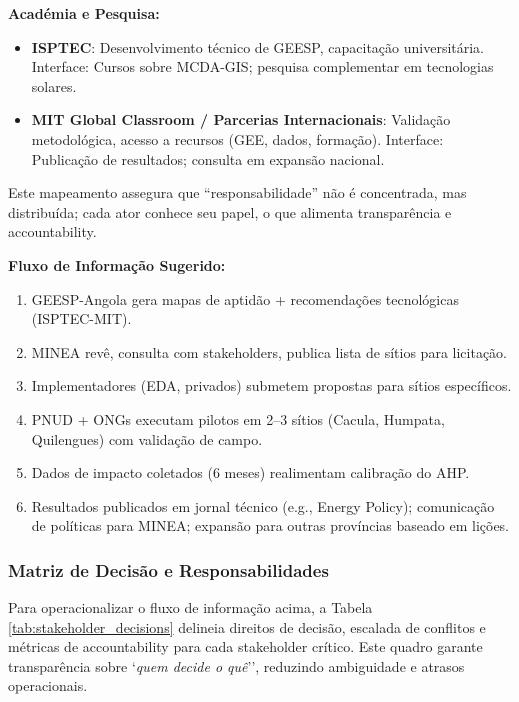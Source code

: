 \documentclass[12pt, a4paper]{article}
\begin{document}
\begin{itemize}
\textbf{Académia e Pesquisa:}
\begin{itemize}
\item \textbf{ISPTEC}: Desenvolvimento técnico de GEESP, capacitação universitária. Interface: Cursos sobre MCDA-GIS; pesquisa complementar em tecnologias solares.
\item \textbf{MIT Global Classroom / Parcerias Internacionais}: Validação metodológica, acesso a recursos (GEE, dados, formação). Interface: Publicação de resultados; consulta em expansão nacional.
\end{itemize}

Este mapeamento assegura que ``responsabilidade'' não é concentrada, mas distribuída; cada ator conhece seu papel, o que alimenta transparência e accountability.

\textbf{Fluxo de Informação Sugerido:}

\begin{enumerate}
\item GEESP-Angola gera mapas de aptidão + recomendações tecnológicas (ISPTEC-MIT).
\item MINEA revê, consulta com stakeholders, publica lista de sítios para licitação.
\item Implementadores (EDA, privados) submetem propostas para sítios específicos.
\item PNUD + ONGs executam pilotos em 2--3 sítios (Cacula, Humpata, Quilengues) com validação de campo.
\item Dados de impacto coletados (6 meses) realimentam calibração do AHP.
\item Resultados publicados em jornal técnico (e.g., Energy Policy); comunicação de políticas para MINEA; expansão para outras províncias baseado em lições.
\end{enumerate}

\subsubsection{Matriz de Decisão e Responsabilidades}

Para operacionalizar o fluxo de informação acima, a Tabela \ref{tab:stakeholder_decisions} delineia direitos de decisão, escalada de conflitos e métricas de accountability para cada stakeholder crítico. Este quadro garante transparência sobre `\textit{quem decide o quê}'', reduzindo ambiguidade e atrasos operacionais.


\end{itemize}
\end{document}
